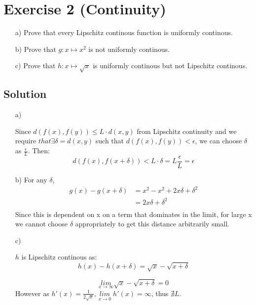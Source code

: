 \documentclass[10pt]{article}
\numberwithin{equation}{section}
\begin{document}
\section*{Exercise 2 (Continuity)}
\begin{enumerate}
\item[a)]{
    Prove that every Lipschitz continous function is uniformly continous.
  }
\item[b)]{
    Prove that $g: x \mapsto x^2$ is not uniformly continous.
  }
\item[c)]{
    Prove that $h: x \mapsto \sqrt{x}$ is uniformly continous but not Lipschitz continous.
  }
\end{enumerate}
\subsection*{Solution}
\begin{enumerate}
\item[a)]{
    Since $d(f(x),f(y)) \leq L \cdot d(x,y)$ from Lipschitz continuity and we require $that  \exists \delta = d(x,y)$ such that $d(f(x),f(y)) < \epsilon$, we can choose $\delta$ as $\frac{\epsilon}{L}$. Then:
    $$d(f(x), f(x+\delta)) < L \cdot \delta = L \frac{\epsilon}{L} = \epsilon$$

  }
\item[b)]{
    For any $\delta$,
    \begin{align*}
      g(x) - g(x + \delta) &= x^2 - x^2 + 2x\delta + \delta^2\\
                           &= 2x\delta + \delta^2\\
    \end{align*}
    Since this is dependent on x on a term that dominates in the limit, for large x we cannot choose $\delta$ appropriately to get this distance arbitrarily small.
  }
\item[c)]{
    $h$ is Lipschitz continous as:
      $$h(x) - h(x + \delta) = \sqrt{x} - \sqrt{x+\delta}$$

      $$\underset{x\rightarrow \infty}{lim} \sqrt{x} - \sqrt{x+\delta} = 0$$
      However as $h'(x) = \frac{1}{2\sqrt{x}}$, $\underset{x\rightarrow 0}{lim} \; h'(x) = \infty$, thus $\nexists L$.
  }

\end{enumerate}
\end{document}

